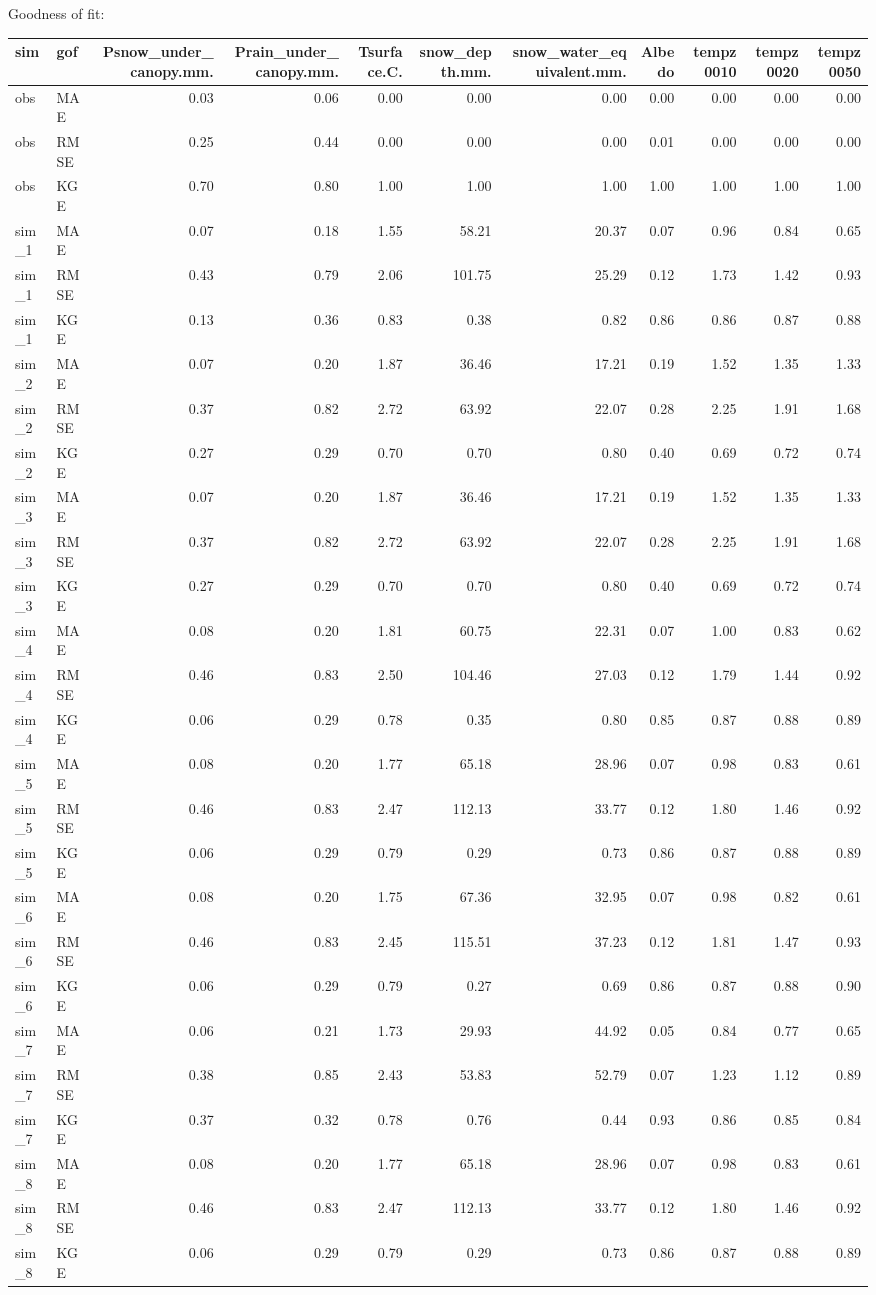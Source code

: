 \documentclass[
]{article}
\begin{document}
Goodness of fit:

\begin{longtable}[]{@{}llrrrrrrrrr@{}}
\toprule
sim & gof & Psnow\_under\_canopy.mm. & Prain\_under\_canopy.mm. &
Tsurface.C. & snow\_depth.mm. & snow\_water\_equivalent.mm. & Albedo &
tempz0010 & tempz0020 & tempz0050\tabularnewline
\midrule
\endhead
obs & MAE & 0.03 & 0.06 & 0.00 & 0.00 & 0.00 & 0.00 & 0.00 & 0.00 &
0.00\tabularnewline
obs & RMSE & 0.25 & 0.44 & 0.00 & 0.00 & 0.00 & 0.01 & 0.00 & 0.00 &
0.00\tabularnewline
obs & KGE & 0.70 & 0.80 & 1.00 & 1.00 & 1.00 & 1.00 & 1.00 & 1.00 &
1.00\tabularnewline
sim\_1 & MAE & 0.07 & 0.18 & 1.55 & 58.21 & 20.37 & 0.07 & 0.96 & 0.84 &
0.65\tabularnewline
sim\_1 & RMSE & 0.43 & 0.79 & 2.06 & 101.75 & 25.29 & 0.12 & 1.73 & 1.42
& 0.93\tabularnewline
sim\_1 & KGE & 0.13 & 0.36 & 0.83 & 0.38 & 0.82 & 0.86 & 0.86 & 0.87 &
0.88\tabularnewline
sim\_2 & MAE & 0.07 & 0.20 & 1.87 & 36.46 & 17.21 & 0.19 & 1.52 & 1.35 &
1.33\tabularnewline
sim\_2 & RMSE & 0.37 & 0.82 & 2.72 & 63.92 & 22.07 & 0.28 & 2.25 & 1.91
& 1.68\tabularnewline
sim\_2 & KGE & 0.27 & 0.29 & 0.70 & 0.70 & 0.80 & 0.40 & 0.69 & 0.72 &
0.74\tabularnewline
sim\_3 & MAE & 0.07 & 0.20 & 1.87 & 36.46 & 17.21 & 0.19 & 1.52 & 1.35 &
1.33\tabularnewline
sim\_3 & RMSE & 0.37 & 0.82 & 2.72 & 63.92 & 22.07 & 0.28 & 2.25 & 1.91
& 1.68\tabularnewline
sim\_3 & KGE & 0.27 & 0.29 & 0.70 & 0.70 & 0.80 & 0.40 & 0.69 & 0.72 &
0.74\tabularnewline
sim\_4 & MAE & 0.08 & 0.20 & 1.81 & 60.75 & 22.31 & 0.07 & 1.00 & 0.83 &
0.62\tabularnewline
sim\_4 & RMSE & 0.46 & 0.83 & 2.50 & 104.46 & 27.03 & 0.12 & 1.79 & 1.44
& 0.92\tabularnewline
sim\_4 & KGE & 0.06 & 0.29 & 0.78 & 0.35 & 0.80 & 0.85 & 0.87 & 0.88 &
0.89\tabularnewline
sim\_5 & MAE & 0.08 & 0.20 & 1.77 & 65.18 & 28.96 & 0.07 & 0.98 & 0.83 &
0.61\tabularnewline
sim\_5 & RMSE & 0.46 & 0.83 & 2.47 & 112.13 & 33.77 & 0.12 & 1.80 & 1.46
& 0.92\tabularnewline
sim\_5 & KGE & 0.06 & 0.29 & 0.79 & 0.29 & 0.73 & 0.86 & 0.87 & 0.88 &
0.89\tabularnewline
sim\_6 & MAE & 0.08 & 0.20 & 1.75 & 67.36 & 32.95 & 0.07 & 0.98 & 0.82 &
0.61\tabularnewline
sim\_6 & RMSE & 0.46 & 0.83 & 2.45 & 115.51 & 37.23 & 0.12 & 1.81 & 1.47
& 0.93\tabularnewline
sim\_6 & KGE & 0.06 & 0.29 & 0.79 & 0.27 & 0.69 & 0.86 & 0.87 & 0.88 &
0.90\tabularnewline
sim\_7 & MAE & 0.06 & 0.21 & 1.73 & 29.93 & 44.92 & 0.05 & 0.84 & 0.77 &
0.65\tabularnewline
sim\_7 & RMSE & 0.38 & 0.85 & 2.43 & 53.83 & 52.79 & 0.07 & 1.23 & 1.12
& 0.89\tabularnewline
sim\_7 & KGE & 0.37 & 0.32 & 0.78 & 0.76 & 0.44 & 0.93 & 0.86 & 0.85 &
0.84\tabularnewline
sim\_8 & MAE & 0.08 & 0.20 & 1.77 & 65.18 & 28.96 & 0.07 & 0.98 & 0.83 &
0.61\tabularnewline
sim\_8 & RMSE & 0.46 & 0.83 & 2.47 & 112.13 & 33.77 & 0.12 & 1.80 & 1.46
& 0.92\tabularnewline
sim\_8 & KGE & 0.06 & 0.29 & 0.79 & 0.29 & 0.73 & 0.86 & 0.87 & 0.88 &
0.89\tabularnewline
\bottomrule
\end{longtable}
\end{document}
